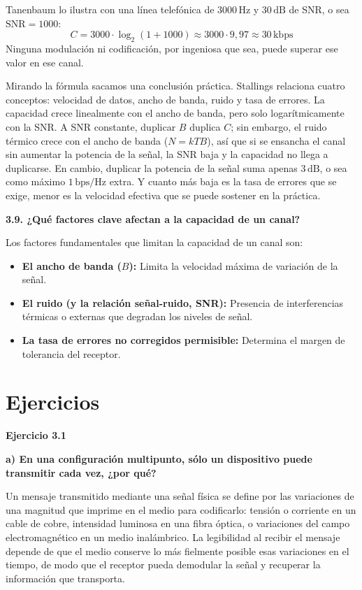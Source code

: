 \documentclass[11pt,a4paper]{article}
\begin{document}
Tanenbaum lo ilustra con una línea telefónica de $3000\,\mathrm{Hz}$ y $30\,\mathrm{dB}$ de SNR, o sea $\mathrm{SNR}=1000$:
\[
  C = 3000\cdot\log_2(1+1000)\approx 3000\cdot 9{,}97\approx 30\,\mathrm{kbps}
\]
Ninguna modulación ni codificación, por ingeniosa que sea, puede superar ese valor en ese canal.

Mirando la fórmula sacamos una conclusión práctica. Stallings relaciona cuatro conceptos: velocidad de datos, ancho de banda, ruido y tasa de errores. La capacidad crece linealmente con el ancho de banda, pero solo logarítmicamente con la SNR. A SNR constante, duplicar $B$ duplica $C$; sin embargo, el ruido térmico crece con el ancho de banda ($N=kTB$), así que si se ensancha el canal sin aumentar la potencia de la señal, la SNR baja y la capacidad no llega a duplicarse. En cambio, duplicar la potencia de la señal suma apenas $3\,\mathrm{dB}$, o sea como máximo $1\,\mathrm{bps/Hz}$ extra. Y cuanto más baja es la tasa de errores que se exige, menor es la velocidad efectiva que se puede sostener en la práctica.

\vspace{0.3cm}
\noindent\textbf{3.9. ¿Qué factores clave afectan a la capacidad de un canal?}\par
Los factores fundamentales que limitan la capacidad de un canal son:
\begin{itemize}
  \item \textbf{El ancho de banda ($B$):} Limita la velocidad máxima de variación de la señal.
  \item \textbf{El ruido (y la relación señal-ruido, SNR):} Presencia de interferencias térmicas o externas que degradan los niveles de señal.
  \item \textbf{La tasa de errores no corregidos permisible:} Determina el margen de tolerancia del receptor.
\end{itemize}

\newpage
\section*{Ejercicios}

\noindent\textbf{Ejercicio 3.1}\par
\noindent\textbf{a) En una configuración multipunto, sólo un dispositivo puede transmitir cada vez, ¿por qué?}\par
Un mensaje transmitido mediante una señal física se define por las variaciones de una magnitud que imprime en el medio para codificarlo: tensión o corriente en un cable de cobre, intensidad luminosa en una fibra óptica, o variaciones del campo electromagnético en un medio inalámbrico. La legibilidad al recibir el mensaje depende de que el medio conserve lo más fielmente posible esas variaciones en el tiempo, de modo que el receptor pueda demodular la señal y recuperar la información que transporta.
\end{document}
